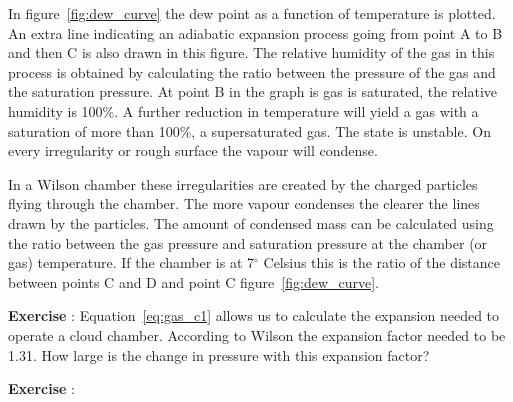 In figure~\ref{fig:dew_curve} the dew point as a function of temperature is plotted. An extra line indicating an adiabatic expansion process going from point A to B and then C is also drawn in this figure. The relative humidity of the gas in this process is obtained by calculating the ratio between the pressure of the gas and the saturation pressure. At point B in the graph is gas is saturated, the relative humidity is 100\%. A further reduction in temperature will yield a gas with a saturation of more than 100\%, a supersaturated gas. The state is unstable. On every irregularity or rough surface the vapour will condense.

In a Wilson chamber these irregularities are created by the charged particles flying through the chamber. The more vapour condenses the clearer the lines drawn by the particles. The amount of condensed mass can be calculated using the ratio between the gas pressure and saturation pressure at the chamber (or gas) temperature. If the chamber is at 7$^\circ$ Celsius this is the ratio of the distance between points C and D and point C figure~\ref{fig:dew_curve}.


\begin{shaded}
\textbf{Exercise \theExercise {}} : Equation~\ref{eq:gas_c1} allows us to calculate the expansion needed to operate a cloud chamber. According to Wilson the expansion factor needed to be 1.31. How large is the change in pressure with this expansion factor?\end{shaded}




\begin{shaded}
\textbf{Exercise \theExercise {}} : \end{shaded}

\footnotemark
\footnotetext{}

